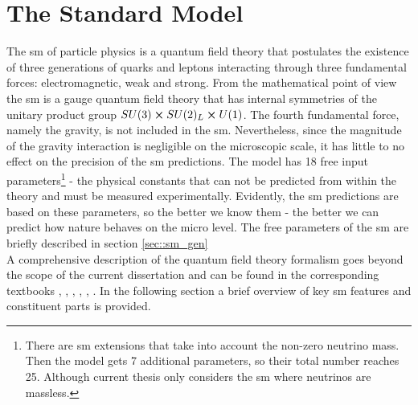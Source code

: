 \chapter{The Standard Model}
\label{ch:the_sm}
    
	The \gls{sm} of particle physics is a quantum field theory that postulates the existence of three generations of quarks and leptons interacting through three fundamental forces: electromagnetic, weak and strong. From the mathematical point of view the \gls{sm} is a gauge quantum field theory that has internal symmetries of the unitary product group $SU(3)\cross SU(2)_L \cross U(1)$.  The fourth fundamental force, namely the gravity, is not included in the \gls{sm}. Nevertheless, since the magnitude of the gravity interaction is negligible on the microscopic scale, it has little to no effect on the precision of the \gls{sm} predictions. The model has 18 free input parameters\footnote{There are \gls{sm} extensions that take into account the non-zero neutrino mass. Then the model gets 7 additional parameters, so their total number reaches 25. Although current thesis only considers the \gls{sm} where neutrinos are massless.} - the physical constants that can not be predicted from within the theory and must be measured experimentally. Evidently, the \gls{sm} predictions are based on these parameters, so the better we know them - the better we can predict how nature behaves on the micro level. The free parameters of the \gls{sm} are briefly described in section \ref{sec::sm_gen}\\

	A comprehensive description of the quantum field theory formalism goes beyond the scope of the current dissertation and can be found in the corresponding textbooks \cite{Peskin}, \cite{bogol}, \cite{Srednicki}, \cite{Berest}, \cite{weinberg}, \cite{Griffiths}. In the following section a brief overview of key \gls{sm} features and constituent parts is provided. \\        
